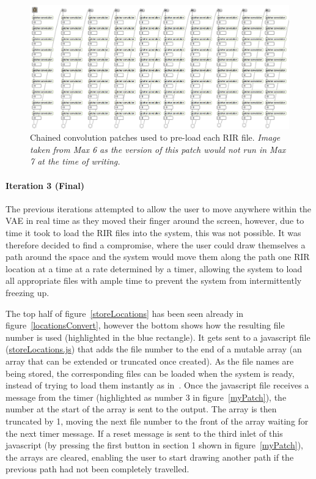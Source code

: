 \documentclass[../../main.tex]{subfiles}
\begin{document}
			\begin{figure}[t]
				\centerline{\includegraphics[width=\textwidth]{Sections/Implementation/Max/images/Max/Iteration2/preload.png}}
				\caption{Chained convolution patches used to pre-load each \ac{RIR} file. \textit{Image taken from Max 6 as the version of this patch would not run in Max 7 at the time of writing.}}
				\label{preload}
			\end{figure}


		 \paragraph{Iteration 3 (Final)}
		 \label{iteration3}

		 	The previous iterations attempted to allow the user to move anywhere within the \ac{VAE} in real time as they moved their finger around the screen, however, due to time it took to load the \ac{RIR} files into the system, this was not possible. It was therefore decided to find a compromise, where the user could draw themselves a path around the space and the system would move them along the path one \ac{RIR} location at a time at a rate determined by a timer, allowing the system to load all appropriate files with ample time to prevent the system from intermittently freezing up.

		 	The top half of figure~\ref{storeLocations} has been seen already in figure~\ref{locationsConvert}, however the bottom shows how the resulting file number is used (highlighted in the blue rectangle). It gets sent to a javascript file (\href{http://lt669.github.io/code/javascript/html/storeLocations.html}{storeLocations.js}) that adds the file number to the end of a mutable array (an array that can be extended or truncated once created). As the file names are being stored, the corresponding files can be loaded when the system is ready, instead of trying to load them instantly as in~. Once the javascript file receives a message from the timer (highlighted as number 3 in figure~\ref{myPatch}), the number at the start of the array is sent to the output. The array is then truncated by 1, moving the next file number to the front of the array waiting for the next timer message. If a reset message is sent to the third inlet of this javascript (by pressing the first button in section 1 shown in figure~\ref{myPatch}), the arrays are cleared, enabling the user to start drawing another path if the previous path had not been completely travelled.
\end{document}
